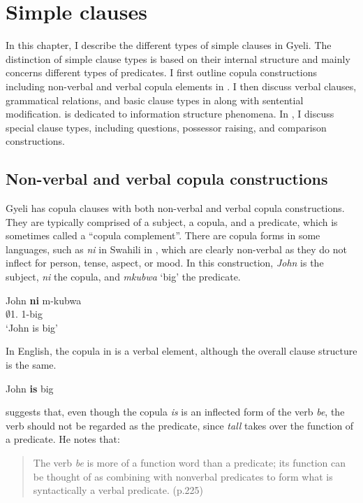 \chapter{Simple clauses}
\label{sec:SC}



In this chapter, I describe the different types of simple clauses in Gyeli. The distinction of simple clause types is based on their internal structure and mainly concerns different types of predicates.  I first outline copula constructions including non-verbal and verbal copula elements in . I then discuss verbal clauses, grammatical relations, and basic clause types in  along with sentential modification.  is dedicated to information structure phenomena.  In , I discuss special clause types, including questions, possessor raising, and comparison constructions.





\section[Copula constructions]{Non-verbal and verbal copula constructions}
\label{sec:nonverbalC}

Gyeli has copula clauses with both non-verbal and verbal copula constructions. They are typically comprised of a subject, a copula, and a predicate, which is sometimes called a ``copula complement''.  There are copula forms in some languages, such as {\itshape ni} in Swahili in , which are clearly non-verbal as they do not inflect for person, tense, aspect, or mood. In this construction, {\itshape John} is the subject, {\itshape ni} the copula, and {\itshape mkubwa} `big' the predicate.

\ea\label{John1} 
\gll John {\bfseries ni} m-kubwa \\
 $\emptyset$1.{\PN} {\COP} 1-big \\
\trans `John is big'
\z

In English, the copula in  is a verbal element, although the overall clause structure is the same.

\ea\label{John} John {\bfseries is} big
\z

\noindent \citet[225]{dryer2007a} suggests that, even though the copula {\itshape is} is an inflected form of the verb {\itshape be}, the verb should not be regarded as the predicate, since {\itshape tall} takes over the function of a predicate. He notes that: 
\begin{quote} The verb {\itshape be} is more of a function word than a predicate; its function can be thought of as combining with nonverbal predicates to form what is syntactically a verbal predicate. (p.225)
\end{quote}

